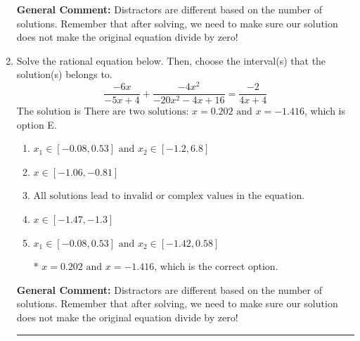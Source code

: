 \documentclass{extbook}[14pt]
\newcommand{\litem}[1]{\item #1

\rule{\textwidth}{0.4pt}}
\begin{document}
\begin{enumerate}
{\textbf{General Comment:} Distractors are different based on the number of solutions. Remember that after solving, we need to make sure our solution does not make the original equation divide by zero!
}
\litem{
Solve the rational equation below. Then, choose the interval(s) that the solution(s) belongs to.
\[ \frac{-6x}{-5x + 4} + \frac{-4x^{2}}{-20x^{2} -4 x + 16} = \frac{-2}{4x + 4} \]The solution is \( \text{There are two solutions: } x = 0.202 \text{ and } x = -1.416 \), which is option E.\begin{enumerate}[label=\Alph*.]
\item \( x_1 \in [-0.08, 0.53] \text{ and } x_2 \in [-1.2,6.8] \)


\item \( x \in [-1.06,-0.81] \)


\item \( \text{All solutions lead to invalid or complex values in the equation.} \)


\item \( x \in [-1.47,-1.3] \)


\item \( x_1 \in [-0.08, 0.53] \text{ and } x_2 \in [-1.42,0.58] \)

* $x = 0.202 \text{ and } x = -1.416$, which is the correct option.
\end{enumerate}

\textbf{General Comment:} Distractors are different based on the number of solutions. Remember that after solving, we need to make sure our solution does not make the original equation divide by zero!
}
\end{enumerate}
\end{document}
